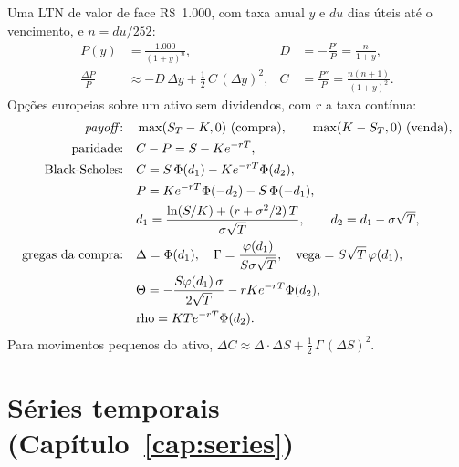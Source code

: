 Uma LTN de valor de face R\$~1.000, com taxa anual $y$ e $du$ dias úteis até o vencimento, e $n = du/252$:
\begin{align*}
P(y) &= \frac{1.000}{(1+y)^{n}} , & D &= -\frac{P'}{P} = \frac{n}{1+y} , \\
\frac{\Delta P}{P} &\approx -D\,\Delta y + \tfrac12\,C\,(\Delta y)^2 , & C &= \frac{P''}{P} = \frac{n(n+1)}{(1+y)^2} .
\end{align*}
Opções europeias sobre um ativo sem dividendos, com $r$ a taxa contínua:
\begin{align*}
\text{\textit{payoff}:}\quad & \max(S_T - K, 0) \ \text{(compra)} , \qquad \max(K - S_T, 0) \ \text{(venda)} , \\
\text{paridade:}\quad & C - P = S - K e^{-rT} , \\
\text{Black-Scholes:}\quad & C = S\,\Phi(d_1) - K e^{-rT}\Phi(d_2) , \\
& P = K e^{-rT}\Phi(-d_2) - S\,\Phi(-d_1) , \\
& d_1 = \frac{\ln(S/K) + (r + \sigma^2/2)\,T}{\sigma\sqrt{T}} , \qquad d_2 = d_1 - \sigma\sqrt{T} , \\
\text{gregas da compra:}\quad & \Delta = \Phi(d_1) , \quad \Gamma = \frac{\varphi(d_1)}{S\sigma\sqrt{T}} , \quad \text{vega} = S\sqrt{T}\,\varphi(d_1) , \\
& \Theta = -\frac{S\varphi(d_1)\,\sigma}{2\sqrt{T}} - rK e^{-rT}\Phi(d_2) , \\
& \text{rho} = K T e^{-rT}\Phi(d_2) .
\end{align*}
Para movimentos pequenos do ativo, $\Delta C \approx \Delta \cdot \Delta S + \tfrac12\,\Gamma\,(\Delta S)^2$.

\section{Séries temporais (Capítulo~\ref{cap:series})}


